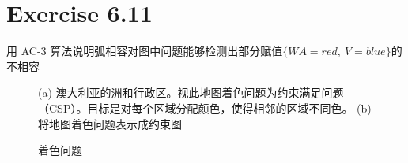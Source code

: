 \documentclass{article}
\begin{document}
\section{Exercise 6.11}
用 AC-3 算法说明弧相容对图中问题能够检测出部分赋值$\{WA = red,\ V = blue\}$的不相容
\begin{figure}[h]
    {
        \centering
        \caption{着色问题}
    }
    (a) 澳大利亚的洲和行政区。视此地图着色问题为约束满足问题（CSP）。目标是对每个区域分配颜色，使得相邻的区域不同色。 (b) 将地图着色问题表示成约束图
\end{figure}
\end{document}
